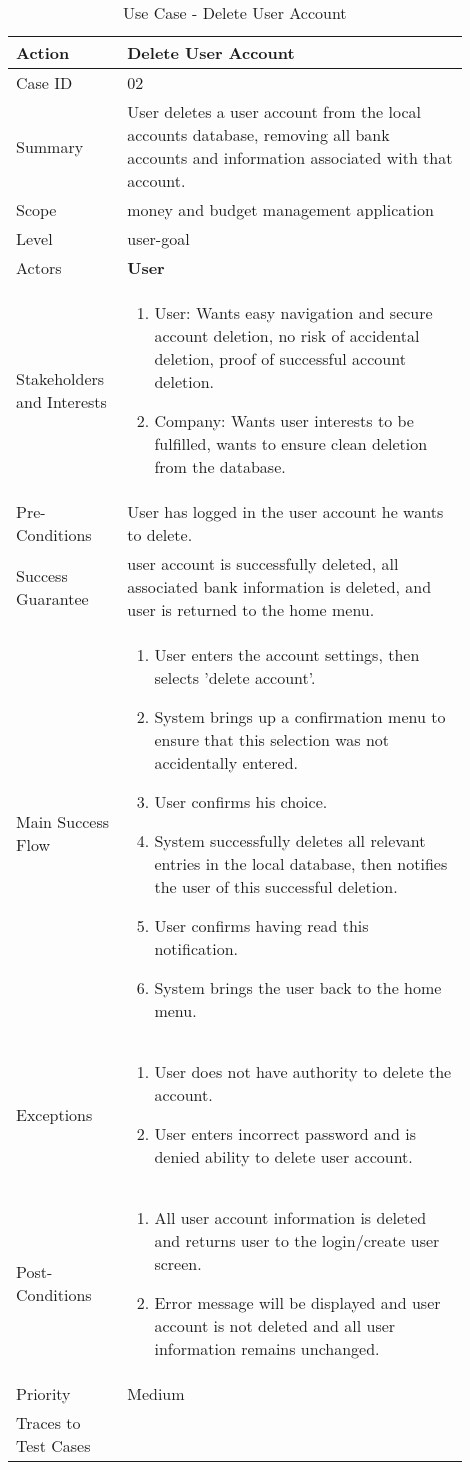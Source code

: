 \documentclass[11pt]{article}
\newcounter{use case ID}
\newcommand\tabularhead[1]{
    \begin{table}[ht]
        \addtocounter{use case ID}{1}
        \caption{Use Case \arabic{use case ID} - #1}
        \vspace{0.2cm}
        \begin{tabular}{|p{0.2\linewidth}|p{0.70\linewidth}|}
            \hline
            \textbf{Action} & \textbf{#1} \\
            \hline}
\newcommand\addrow[2]{#1 & #2\\ \hline}
\newcommand\addmulrow[2]{ \begin{minipage}[t][][t]{2.5cm}#1\end{minipage}
                &\begin{minipage}[t][][t]{11cm}
                    \begin{enumerate}[itemsep=-1ex] #2   \end{enumerate}
                \end{minipage}\vfill\\ \hline}
\newenvironment{usecase}{\tabularhead}
        {\hline\end{tabular}\end{table}}
\begin{document}
\begin{usecase}{Delete User Account}
    \addrow{Case ID}{02}
    \addrow{Summary}{User deletes a user account from the local accounts database, removing all bank accounts and information associated with that account.}
     \addrow{Scope}{money and budget management application}
     \addrow{Level}{user-goal}
     \addrow{Actors}{\textbf{User}}
     \addmulrow{Stakeholders and Interests}{
     \item User: Wants easy navigation and secure account deletion, no risk of accidental deletion, proof of successful account deletion.
     \item Company: Wants user interests to be fulfilled, wants to ensure clean deletion from the database. }
     \addrow{Pre-Conditions}{User has logged in the user account he wants to delete.}
     \addrow{Success Guarantee}{user account is successfully deleted, all associated bank information is deleted, and user is returned to the home menu.}
     \addmulrow{Main Success Flow}{
     \item User enters the account settings, then selects 'delete account'.
     \item System brings up a confirmation menu to ensure that this selection was not accidentally entered.
     \item User confirms his choice.
     \item System successfully deletes all relevant entries in the local database, then notifies the user of this successful deletion.
     \item User confirms having read this notification.
     \item System brings the user back to the home menu.}
     \addmulrow{Exceptions}{
     \item User does not have authority to delete the account.
     \item User enters incorrect password and is denied ability to delete user account.
     }
     \addmulrow{Post-Conditions}{
     \item All user account information is deleted and returns user to the login/create user screen.
     \item Error message will be displayed and user account is not deleted and all user information remains unchanged.
     }
     \addrow{Priority}{Medium}
     \addrow{Traces to Test Cases}{}
\end{usecase}
\end{document}
